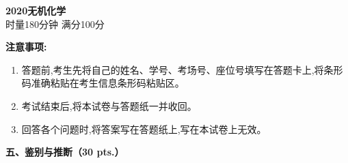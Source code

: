 \begin{center}
    {\LARGE \textbf{2020无机化学}} \\[2ex]
    {\large 时量180分钟 \quad 满分100分}
\end{center}

\vspace{0.5cm}
\noindent\textbf{注意事项:}
\begin{enumerate}[label=\arabic*., parsep=0pt, itemsep=0pt]
    \item 答题前,考生先将自己的姓名、学号、考场号、座位号填写在答题卡上,将条形码准确粘贴在考生信息条形码粘贴区。
    \item 考试结束后,将本试卷与答题纸一并收回。
    \item 回答各个问题时,将答案写在答题纸上,写在本试卷上无效。
\end{enumerate}

\vspace{0.5cm}
\noindent\textbf{五、鉴别与推断（30 pts.）}

